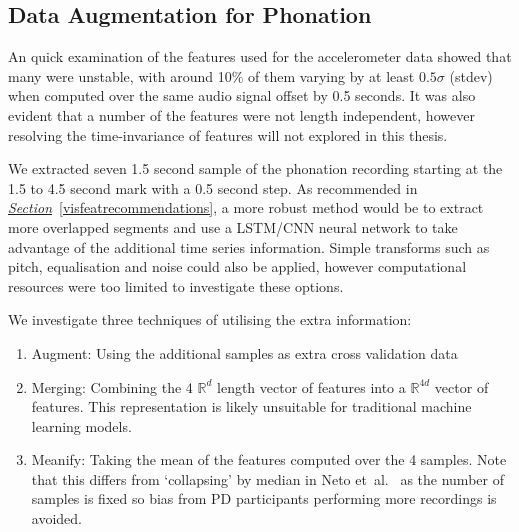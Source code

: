 \documentclass[12pt, twoside]{book}
\begin{document}
\subsection{Data Augmentation for Phonation}
An quick examination of the features used for the accelerometer data showed that many were unstable, with around 10\% of them varying by at least $0.5\sigma$ (stdev) when computed over the same audio signal offset by 0.5 seconds. It was also evident that a number of the features were not length independent, however resolving the time-invariance of features will not explored in this thesis.

We extracted seven 1.5 second sample of the phonation recording starting at the 1.5 to 4.5 second mark with a 0.5 second step. As recommended in \textit{\hyperref[visfeatrecommendations]{Section}}~\ref{visfeatrecommendations}, a more robust method would be to extract more overlapped segments and use a LSTM/CNN neural network to take advantage of the additional time series information. Simple transforms such as pitch, equalisation and noise could also be applied, however computational resources were too limited to investigate these options. 


We investigate three techniques of utilising the extra information:
\begin{enumerate}
	\item Augment: Using the additional samples as extra cross validation data
	\item Merging: Combining the 4 $\mathbb{R}^d$ length vector of features into a $\mathbb{R}^{4d}$ vector of features. This representation is likely unsuitable for traditional machine learning models.
	\item Meanify: Taking the mean of the features computed over the 4 samples. Note that this differs from `collapsing' by median in Neto et~al.~\cite{mpowerneto2017analysis} as the number of samples is fixed so bias from PD participants performing more recordings is avoided. 
\end{enumerate}
\end{document}
